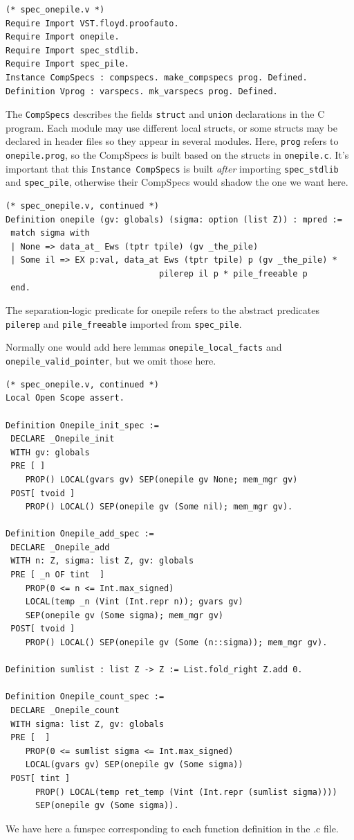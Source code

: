 \documentclass[runningheads,orivec]{llncs}
\begin{document}
\begin{lstlisting}
(* spec_onepile.v *)
Require Import VST.floyd.proofauto.
Require Import onepile.
Require Import spec_stdlib.
Require Import spec_pile.
Instance CompSpecs : compspecs. make_compspecs prog. Defined.
Definition Vprog : varspecs. mk_varspecs prog. Defined.
\end{lstlisting}
The \lstinline{CompSpecs} describes the fields
\lstinline{struct} and \lstinline{union} declarations
in the C program.  Each module may use different local
structs, or some structs may be declared in header files
so they appear in several modules.  Here, \lstinline{prog}
refers to \lstinline{onepile.prog}, so the CompSpecs
is built based on the structs in \lstinline{onepile.c}.
It's important that this \lstinline{Instance CompSpecs}
is built \emph{after} importing
\lstinline{spec_stdlib} and \lstinline{spec_pile},
otherwise their CompSpecs would shadow the one we want here.

\begin{lstlisting}
(* spec_onepile.v, continued *)
Definition onepile (gv: globals) (sigma: option (list Z)) : mpred :=
 match sigma with
 | None => data_at_ Ews (tptr tpile) (gv _the_pile)
 | Some il => EX p:val, data_at Ews (tptr tpile) p (gv _the_pile) *
                               pilerep il p * pile_freeable p
 end.
\end{lstlisting}
The separation-logic predicate for onepile
refers to the abstract predicates \lstinline{pilerep}
and \lstinline{pile_freeable} imported from \lstinline{spec_pile}.

Normally one would add here lemmas
\lstinline{onepile_local_facts} and
\lstinline{onepile_valid_pointer}, but we omit those here.

\begin{lstlisting}
(* spec_onepile.v, continued *)
Local Open Scope assert.

Definition Onepile_init_spec :=
 DECLARE _Onepile_init
 WITH gv: globals
 PRE [ ] 
    PROP() LOCAL(gvars gv) SEP(onepile gv None; mem_mgr gv)
 POST[ tvoid ]
    PROP() LOCAL() SEP(onepile gv (Some nil); mem_mgr gv).

Definition Onepile_add_spec :=
 DECLARE _Onepile_add
 WITH n: Z, sigma: list Z, gv: globals
 PRE [ _n OF tint  ]
    PROP(0 <= n <= Int.max_signed)
    LOCAL(temp _n (Vint (Int.repr n)); gvars gv)
    SEP(onepile gv (Some sigma); mem_mgr gv)
 POST[ tvoid ]
    PROP() LOCAL() SEP(onepile gv (Some (n::sigma)); mem_mgr gv).

Definition sumlist : list Z -> Z := List.fold_right Z.add 0.

Definition Onepile_count_spec :=
 DECLARE _Onepile_count
 WITH sigma: list Z, gv: globals
 PRE [  ]
    PROP(0 <= sumlist sigma <= Int.max_signed)
    LOCAL(gvars gv) SEP(onepile gv (Some sigma))
 POST[ tint ]
      PROP() LOCAL(temp ret_temp (Vint (Int.repr (sumlist sigma))))
      SEP(onepile gv (Some sigma)).
\end{lstlisting}
We have here a funspec corresponding to each function definition
in the .c file.
\end{document}
